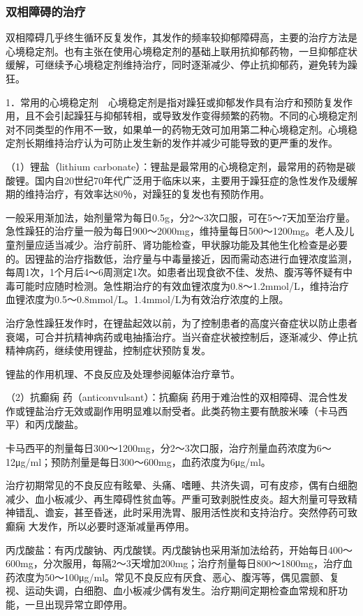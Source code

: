 \subsubsection{双相障碍的治疗}

双相障碍几乎终生循环反复发作，其发作的频率较抑郁障碍高，主要的治疗方法是心境稳定剂。也有主张在使用心境稳定剂的基础上联用抗抑郁药物，一旦抑郁症状缓解，可继续予心境稳定剂维持治疗，同时逐渐减少、停止抗抑郁药，避免转为躁狂。

1．常用的心境稳定剂　心境稳定剂是指对躁狂或抑郁发作具有治疗和预防复发作用，且不会引起躁狂与抑郁转相，或导致发作变得频繁的药物。不同的心境稳定剂对不同类型的作用不一致，如果单一的药物无效可加用第二种心境稳定剂。心境稳定剂长期维持治疗认为可防止发生新的发作并减少可能导致的更严重的发作。

（1）锂盐（lithium
carbonate）：锂盐是最常用的心境稳定剂，最常用的药物是碳酸锂。国内自20世纪70年代广泛用于临床以来，主要用于躁狂症的急性发作及缓解期的维持治疗，有效率达80％，对躁狂的复发也有预防作用。

一般采用渐加法，始剂量常为每日0.5g，分2～3次口服，可在5～7天加至治疗量。急性躁狂的治疗量一般为每日900～2000mg，维持量每日500～1200mg。老人及儿童剂量应适当减少。治疗前肝、肾功能检查，甲状腺功能及其他生化检查是必要的。因锂盐的治疗指数低，治疗量与中毒量接近，因而需动态进行血锂浓度监测，每周1次，1个月后4～6周测定1次。如患者出现食欲不佳、发热、腹泻等怀疑有中毒可能时应随时检测。急性期治疗的有效血锂浓度为0.8～1.2mmol/L，维持治疗血锂浓度为0.5～0.8mmol/L。1.4mmol/L为有效治疗浓度的上限。

治疗急性躁狂发作时，在锂盐起效以前，为了控制患者的高度兴奋症状以防止患者衰竭，可合并抗精神病药或电抽搐治疗。当兴奋症状被控制后，逐渐减少、停止抗精神病药，继续使用锂盐，控制症状预防复发。

锂盐的作用机理、不良反应及处理参阅躯体治疗章节。

（2）抗癫痫
药（anticonvulsant）：抗癫痫
药用于难治性的双相障碍、混合性发作或锂盐治疗无效或副作用明显难以耐受者。此类药物主要有酰胺米嗪（卡马西平）和丙戊酸盐。

卡马西平的剂量每日300～1200mg，分2～3次口服，治疗剂量血药浓度为6～12μg/ml；预防剂量是每日300～600mg，血药浓度为6μg/ml。

治疗初期常见的不良反应有眩晕、头痛、嗜睡、共济失调，可有皮疹，偶有白细胞减少、血小板减少、再生障碍性贫血等。严重可致剥脱性皮炎。超大剂量可导致精神错乱、谵妄，甚至昏迷，此时采用洗胃、服用活性炭和支持治疗。突然停药可致癫痫
大发作，所以必要时逐渐减量再停用。

丙戊酸盐：有丙戊酸钠、丙戊酸镁。丙戊酸钠也采用渐加法给药，开始每日400～600mg，分次服用，每隔2～3天增加200mg；治疗剂量每日800～1800mg，治疗血药浓度为50～100μg/ml。常见不良反应有厌食、恶心、腹泻等，偶见震颤、复视、运动失调，白细胞、血小板减少偶有发生。治疗期间定期检查血常规和肝功能，一旦出现异常立即停用。

